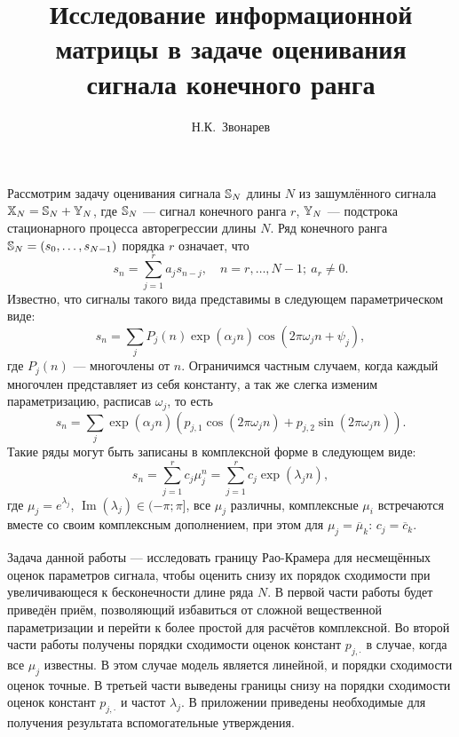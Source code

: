 \documentclass[12pt,a4paper]{article}
\begin{document}
\title{Исследование информационной матрицы в задаче оценивания сигнала конечного ранга}
\author{Н.К.~Звонарев}



\maketitle

Рассмотрим задачу оценивания сигнала $\mathbb{S}_N$ длины $N$ из зашумлённого сигнала $\mathbb{X}_N = \mathbb{S}_N + \mathbb{Y}_N$, где $\mathbb{S}_N$ --- сигнал конечного ранга $r$, $\mathbb{Y}_N$ --- подстрока стационарного процесса авторегрессии длины $N$. Ряд конечного ранга $\mathbb{S}_N = (s_0, \ldots, s_{N-1})$ порядка $r$ означает, что 
\begin{equation*}
s_n = \sum_{j = 1}^{r} a_j s_{n-j}, \quad n = r, \ldots, N - 1;\  a_r\neq 0.
\end{equation*}
Известно, что сигналы такого вида представимы в следующем параметрическом виде:
\begin{equation*} \label{task:parametricform}
s_n = \sum_j P_j(n) \exp(\alpha_j n) \cos(2 \pi \omega_j n + \psi_j),
\end{equation*}
где $P_j(n)$ --- многочлены от $n$. Ограничимся частным случаем, когда каждый многочлен представляет из себя константу, а так же слегка изменим параметризацию, расписав $\omega_j$, то есть
\begin{equation} \label{task:redparametricform}
s_n = \sum_j \exp(\alpha_j n) (p_{j, 1} \cos(2 \pi \omega_j n) + p_{j, 2} \sin(2 \pi \omega_j n)).
\end{equation}
Такие ряды могут быть записаны в комплексной форме в следующем виде:
\begin{equation} \label{task:compparametricform}
s_n = \sum_{j=1}^r c_j \mu_j^n = \sum_{j=1}^r c_j \exp(\lambda_j n),
\end{equation}
где $\mu_j = e^{\lambda_j}$, $\operatorname{Im}(\lambda_j) \in (-\pi; \pi]$, все $\mu_j$ различны, комплексные $\mu_i$ встречаются вместе со своим комплексным дополнением, при этом для $\mu_j = \overline \mu_k$: $c_j = \overline c_k$.

Задача данной работы --- исследовать границу Рао-Крамера для несмещённых оценок параметров сигнала, чтобы оценить снизу их порядок сходимости при увеличивающеся к бесконечности длине ряда $N$. В первой части работы будет приведён приём, позволяющий избавиться от сложной вещественной параметризации и перейти к более простой для расчётов комплексной. Во второй части работы получены порядки сходимости оценок констант $p_{j, \cdot}$ в случае, когда все $\mu_j$ известны. В этом случае модель является линейной, и порядки сходимости оценок точные. В третьей части выведены границы снизу на порядки сходимости оценок констант $p_{j, \cdot}$ и частот $\lambda_j$. В приложении приведены необходимые для получения результата вспомогательные утверждения.
\end{document}
